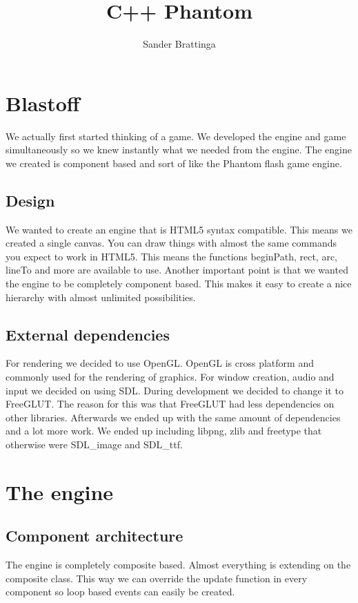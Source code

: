 \documentclass[acmtoplas,acmnow]{acmtrans2m}
\title{C++ Phantom}
\author{Sander Brattinga}
\begin{document}
\begin{bottomstuff}
\end{bottomstuff}

\maketitle
\section{Blastoff}
We actually first started thinking of a game. We developed the engine and game simultaneously so we knew instantly what we needed from the engine. The engine we created is component based and sort of like the Phantom flash game engine. 

\subsection{Design}
We wanted to create an engine that is HTML5 syntax compatible. This means we created a single canvas. You can draw things with almost the same commands you expect to work in HTML5. This means the functions beginPath, rect, arc, lineTo and more are available to use.\newline
Another important point is that we wanted the engine to be completely component based. This makes it easy to create a nice hierarchy with almost unlimited possibilities.

\subsection{External dependencies}
For rendering we decided to use OpenGL. OpenGL is cross platform and commonly used for the rendering of graphics. For window creation, audio and input we decided on using SDL. During development we decided to change it to FreeGLUT. The reason for this was that FreeGLUT had less dependencies on other libraries. Afterwards we ended up with the same amount of dependencies and a lot more work. We ended up including libpng, zlib and freetype that otherwise were SDL\_image and SDL\_ttf.

\newpage
\twocolumn
\section{The engine}

\subsection{Component architecture}
The engine is completely composite based. Almost everything is extending on the composite class. This way we can override the update function in every component so loop based events can easily be created. 
\end{document}
